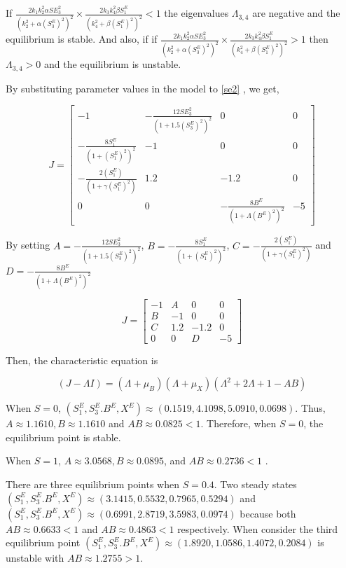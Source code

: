If $\frac{2k_1k_2^2\alpha SE_3^2}{(k_2^2 + \alpha(S_3^E)^2)^2} \times \frac{2k_3k_4^2\beta S_1^E}{(k_4^2+\beta(S_1^E)^2)^2} < 1$ the eigenvalues $\Lambda_{3,4}$ are negative and the equilibrium is stable. And also, if if $\frac{2k_1k_2^2\alpha SE_3^2}{(k_2^2 + \alpha(S_3^E)^2)^2} \times \frac{2k_3k_4^2\beta S_1^E}{(k_4^2+\beta(S_1^E)^2)^2} > 1$  then $\Lambda_{3,4} > 0$ and the equilibrium is unstable. 

By substituting parameter values in the model to \eqref{se2} , we get,

\begin{equation}
    \label{re1}
     J = \begin{bmatrix}
-1 & -\frac{12 SE_3^2}{(1 + 1.5(S_3^E)^2)^2} & 0 & 0 \\
-\frac{8 S_1^E}{(1+(S_1^E)^2)^2} & -1 & 0 & 0 \\
-\frac{2(S_1^E)}{(1+\gamma (S_1^E)^2)} & 1.2 & -1.2 & 0 \\
0 & 0 & -\frac{8 B^E}{(1+\Lambda(B^E)^2)^2} & -5
\end{bmatrix}
\end{equation}

By setting $A =  -\frac{12 SE_3^2}{(1 + 1.5(S_3^E)^2)^2}$, $B = -\frac{8 S_1^E}{(1+(S_1^E)^2)^2} $, $C = -\frac{2(S_1^E)}{(1+\gamma (S_1^E)^2)} $ and $D =  -\frac{8 B^E}{(1+\Lambda(B^E)^2)^2}$

\begin{equation}
    \label{re1}
     J = \begin{bmatrix}
-1 & A& 0 & 0 \\
B & -1 & 0 & 0 \\
C & 1.2 & -1.2 & 0 \\
0 & 0 &D & -5
\end{bmatrix}
\end{equation}

Then, the characteristic equation is

\begin{equation}
    (J - \Lambda I) = (\Lambda + \mu_B)(\Lambda + \mu_X) (\Lambda^2 + 2\Lambda +1 - AB)
\end{equation}

When $S= 0$, $(S_1^E, S_3^E.B^E, X^E) \approx (0.1519, 4.1098, 5.0910, 0.0698)$. Thus, $A \approx 1.1610, B \approx  1.1610$ and $AB \approx  0.0825 < 1$. Therefore, when $S = 0$, the equilibrium point is stable.

When $S = 1$, $A \approx  3.0568, B \approx 0.0895$, and $AB \approx 0.2736 < 1$ . 

 There are three equilibrium points when $S = 0.4$. Two steady states $(S_1^E,S_3^E.B^E,X^E) \approx (3.1415, 0.5532, 0.7965, 0.5294)$ and $(S_1^E,S_3^E.B^E,X^E) \approx (0.6991, 2.8719, 3.5983, 0.0974)$ because both $AB \approx  0.6633 < 1$ and $AB \approx 0.4863 < 1 $ respectively. When consider the  third equilibrium point $(S_1^E,S_3^E.B^E,X^E) \approx  (1.8920, 1.0586, 1.4072, 0.2084)$  is unstable with $AB \approx  1.2755 > 1$.





